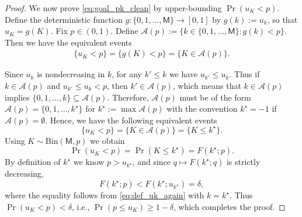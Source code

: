\documentclass[onecolumn]{IEEEtran} %
\newcommand{\1}{\mathbbm{1}}
\theoremstyle{boldremark}
\begin{document}
\begin{proof}
We now prove \eqref{eq:goal_pk_clean} by upper-bounding \(\Pr(u_K<p)\). Define the deterministic function $g:\{0,1,\dots,\textsf{M}\}\to[0,1]$ by $g(k):=u_k$, so that
$u_K=g(K)$. Fix $p\in(0,1)$. Define $\mathcal{A}(p):=\{k\in\{0,1,\dots,\textsf{M}\}: g(k)<p\}.$
Then we have the equivalent events
\begin{align}\label{EQ_eq_events}
    \{u_K<p\}=\{g(K)<p\}=\{K\in\mathcal{A}(p)\}.    
\end{align}

Since $u_k$ is nondecreasing in $k$, for any $k'\le k$ we have $u_{k'}\le u_k$. 
Thus if $k\in\mathcal{A}(p)$ and $u_{k'}\le u_k<p$, then $k'\in\mathcal{A}(p)$,
which means that $k\in\mathcal{A}(p)$ implies $\{0,1,\dots,k\}\subseteq \mathcal{A}(p)$.
Therefore, $\mathcal{A}(p)$ must be of the form $\mathcal{A}(p)=\{0,1,\dots,k^\star\}$ for
$k^\star:=\max\mathcal{A}(p)$ with the convention $k^\star=-1$ if $\mathcal{A}(p)=\emptyset$. Hence, we have the following equivalent events
\begin{equation}\label{eq:event_equiv_again}
\{u_K<p\}=\{K\in\mathcal{A}(p)\}=\{K\le k^\star\}.
\end{equation}
Using $K\sim\mathrm{Bin}(\textsf{M},p)$ we obtain
\[
\Pr(u_K<p)=\Pr(K\le k^\star)=F(k^\star;p).
\]
By definition of $k^\star$ we know $p>u_{k^\star}$, and since $q\mapsto F(k^\star;q)$ is strictly decreasing,
\[
F(k^\star;p)<F(k^\star;u_{k^\star})=\delta,
\]
where the equality follows from \eqref{eq:def_uk_again} with $k=k^\star$.
Thus $\Pr(u_K<p)<\delta$, i.e., $\Pr(p\le u_K)\ge 1-\delta$, which completes the proof.
\end{proof}
\end{document}
